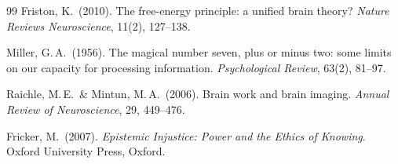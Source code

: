 ﻿\documentclass[a4paper,12pt]{article}
\theoremstyle{definition}
\begin{document}
\begin{thebibliography}{99}
	Friston, K.\ (2010).
	The free-energy principle: a unified brain theory?
	\textit{Nature Reviews Neuroscience}, 11(2), 127--138.

	Miller, G.\,A.\ (1956).
	The magical number seven, plus or minus two: some limits on our capacity for processing information.
	\textit{Psychological Review}, 63(2), 81--97.

	Raichle, M.\,E.\ \& Mintun, M.\,A.\ (2006).
	Brain work and brain imaging.
	\textit{Annual Review of Neuroscience}, 29, 449--476.

	Fricker, M.\ (2007).
	\textit{Epistemic Injustice: Power and the Ethics of Knowing}.
	Oxford University Press, Oxford.

	\end{thebibliography}
\end{document}
